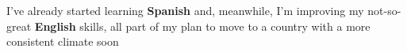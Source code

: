     { }
    { }
    {I've already started learning \textbf{Spanish} and, meanwhile, I'm improving my not-so-great \textbf{English} skills, all part of my plan to move to a country with a more consistent climate soon}
